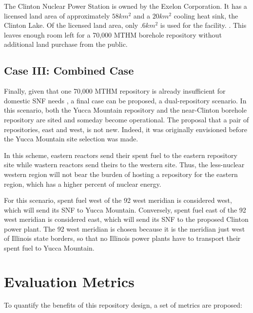 The Clinton Nuclear Power Station is owned by the Exelon Corporation. It has a 
licensed land area of approximately $58km^2$ and a $20km^2$ cooling heat sink, 
the Clinton Lake. Of the licensed land area, only $.6km^2$ is used for the facility.  
\cite{nrc_chapter_2007}.  This leaves enough room left for a 70,000 \gls{MTHM} 
borehole repository without additional land purchase from the public.

\subsection{Case III: Combined Case}
Finally, given that one 70,000 MTHM repository is already insufficient for 
domestic \gls{SNF} needs \cite{doe_report_2008}, a final case can be proposed, 
a dual-repository scenario. In this scenario, both the Yucca Mountain 
repository and the near-Clinton borehole repository are sited and someday 
become operational. The proposal that a pair of repositories, east and west, is 
not new. Indeed, it was originally envisioned before the Yucca Mountain site 
selection was made.

In this scheme, eastern reactors send their spent fuel to the eastern 
repository site while wastern reactors send theirs to the western site. Thus, 
the less-nuclear western region will not bear the burden of hosting a 
repository for the eastern region, which has a higher percent of nuclear 
energy. 

For this scenario, spent fuel west of the 92 west meridian is considered west, 
which will send its \gls{SNF} to Yucca Mountain. Conversely, spent fuel east of the 92 west
meridian is considered east, which will send its \gls{SNF} to the proposed Clinton 
power plant. The 92 west meridian is chosen because it is the meridian just west of
Illinois state borders, so that no Illinois power plants have to transport their
spent fuel to Yucca Mountain. %



\section{Evaluation Metrics}

To quantify the benefits of this repository design, a set of metrics are 
proposed:

